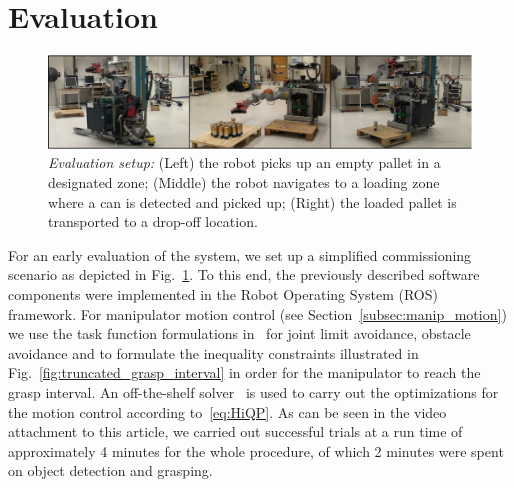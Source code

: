 \section{Evaluation}
\label{sec:eval}
% 
\begin{figure}[t!]
  \begin{center}
    \includegraphics[width =1\linewidth]{figs/evaluation}
    \caption{\textit{Evaluation setup:} (Left) the robot picks up an empty pallet in a designated
      zone; (Middle) the robot navigates to a loading zone where a can is detected and picked up;
      (Right) the loaded pallet is transported to a drop-off location.}
    \label{fig:evaluation}
    \vspace{-0.5cm}
  \end{center}
\end{figure}
% 
For an early evaluation of the system, we set up a simplified commissioning scenario as depicted in
Fig.~\ref{fig:evaluation}. To this end, the previously described software components were
implemented in the Robot Operating System (ROS)~\cite{Quig09} framework. For manipulator motion
control (see Section~\ref{subsec:manip_motion}) we use the task function formulations
in~\cite{Kano09} for joint limit avoidance, obstacle avoidance and to formulate the inequality
constraints illustrated in Fig.~\ref{fig:truncated_grasp_interval} in order for the manipulator to
reach the grasp interval. An off-the-shelf solver~\cite{Guro15} is used to carry out the
optimizations for the motion control according to~\eqref{eq:HiQP}. As can be seen in the video
attachment to this article, we carried out successful trials at a run time of approximately 4
minutes for the whole procedure, of which 2 minutes were spent on object detection and grasping.



